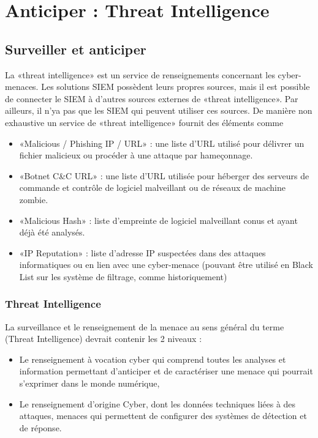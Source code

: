 %

\section{Anticiper : Threat Intelligence}

\subsection{Surveiller et anticiper}

La «threat intelligence» est un service de renseignements concernant les cyber-menaces. Les solutions SIEM possèdent leurs propres sources, mais il est possible de connecter le SIEM à d’autres sources externes de «threat intelligence». Par ailleurs, il n'ya pas que les SIEM qui peuvent utiliser ces sources. De manière non exhaustive un service de «threat intelligence»  fournit des éléments comme 
\begin{itemize}
  \item «Malicious / Phishing IP / URL» : une liste d’URL utilisé pour  délivrer un fichier malicieux ou procéder à une attaque par hameçonnage.
  \item 	«Botnet C\&C URL» : une liste d’URL utilisée pour héberger des serveurs de commande et contrôle de logiciel malveillant ou de réseaux de machine zombie.
  \item «Malicious Hash» : liste d’empreinte de logiciel malveillant conus et ayant déjà été analysés.
  \item  «IP Reputation» : liste d’adresse IP suspectées dans des attaques informatiques ou en lien avec une cyber-menace (pouvant être utilisé en Black List sur les système de filtrage, comme historiquement)
\end{itemize}



\begin{frame}
\frametitle<presentation>{Threat Intelligence}
La surveillance et le renseignement de la menace au sens général du terme (Threat Intelligence) devrait contenir les 2 niveaux :

\begin{itemize}
  \item Le renseignement à vocation cyber qui comprend toutes les analyses et information permettant d'anticiper et de caractériser une menace qui pourrait s'exprimer dans le monde numérique,
  \item Le renseignement d'origine Cyber, dont les données techniques liées à des attaques, menaces qui permettent de configurer des systèmes de détection et de réponse.
\end{itemize}
\end{frame}

